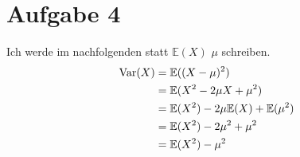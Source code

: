 \documentclass{article}
\newcommand{\E}{\mathbb{E}}
\DeclareMathOperator{\Var}{Var}
\renewcommand{\E}{\mathbb{E}}
\begin{document}
	\section*{Aufgabe 4}
	Ich werde im nachfolgenden statt $\E(X)$ $\mu$ schreiben.
	\begin{align}
		\Var(X) &= \E((X-\mu)^2) \notag \\
		&= \E(X^2 - 2\mu X + \mu^2) \notag \\
		&= \E(X^2) - 2\mu\E(X) + \E(\mu^2) \notag \\
		&= \E(X^2) - 2\mu^2 + \mu^2 \notag \\
		&= \E(X^2) - \mu^2 \notag
	\end{align}
	
\end{document}
